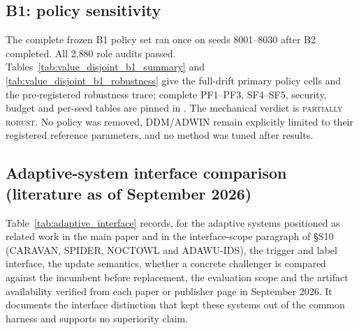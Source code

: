 \documentclass[a4paper,11pt]{article}
\makeatletter
\let\supp@subsection\subsection
\renewcommand{\subsection}{\FloatBarrier\supp@subsection}
\makeatother
\begin{document}
\subsection{B1: policy sensitivity}

The complete frozen B1 policy set ran once on seeds 8001--8030 after B2 completed. All
2{,}880 role audits passed. Tables~\ref{tab:value_disjoint_b1_summary} and
\ref{tab:value_disjoint_b1_robustness} give the full-drift primary policy cells and the
pre-registered robustness trace; complete PF1--PF3, SF4--SF5, security, budget and per-seed
tables are pinned in . The mechanical
verdict is \textsc{partially robust}. No policy was removed, DDM/ADWIN remain explicitly
limited to their registered reference parameters, and no method was tuned after results.




\subsection{Adaptive-system interface comparison (literature as of September 2026)}

Table~\ref{tab:adaptive_interface} records, for the adaptive systems positioned as related
work in the main paper and in the interface-scope paragraph of \S S10 (CARAVAN, SPIDER,
NOCTOWL and ADAWU-IDS), the trigger and label interface, the update semantics, whether a
concrete challenger is compared against the incumbent before replacement, the evaluation
scope and the artifact availability verified from each paper or publisher page in
September 2026. It documents the interface distinction that kept these systems out of the
common harness and supports no superiority claim.
\end{document}
